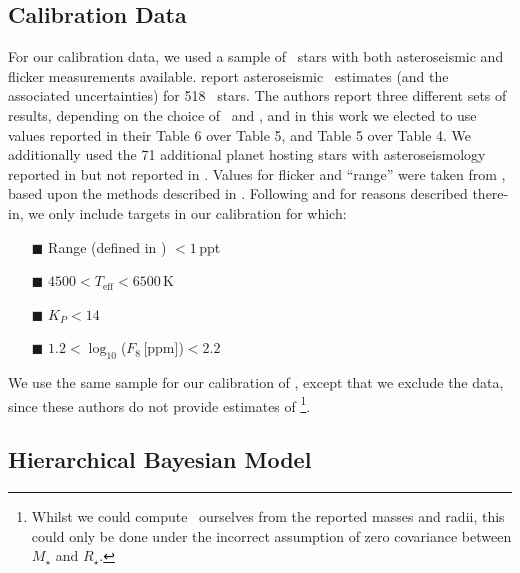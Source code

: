 
\subsection{Calibration Data}

For our calibration data, we used a sample of \Kepler\ stars with
both asteroseismic and flicker measurements available. \citet{chaplin:2014}
report asteroseismic \rhostar\ estimates (and the associated uncertainties) for
518 \Kepler\ stars. The authors report three different sets of results,
depending on the choice of \Teff\ and \FeH, and in this work we elected to use
values reported in their Table 6 over Table 5, and Table 5 over Table 4. We
additionally used the 71 additional planet hosting stars with asteroseismology
reported in \citet{huber:2013} but not reported in \citet{chaplin:2014}. Values
for flicker and ``range'' were taken from \citet{kipping:2014}, based upon the
methods described in \citet{bastien:2013}. Following \citet{kipping:2014} and
for reasons described there-in, we only include targets in our calibration for
which:

\begin{itemize}
\item[{\tiny$\blacksquare$}] Range (defined in \citealt{bastien:2013})
$<1$\,ppt
\item[{\tiny$\blacksquare$}] $4500<T_{\mathrm{eff}}<6500$\,K
\item[{\tiny$\blacksquare$}] $K_P<14$
\item[{\tiny$\blacksquare$}] $1.2 < \log_{10}$($F_8$\,[ppm])$< 2.2$
\end{itemize}

We use the same sample for our calibration of \logg, except that we exclude the
\citet{huber:2013} data, since these authors do not provide estimates of
\logg\footnote{Whilst we could compute \logg\ ourselves from the reported
masses and radii, this could only be done under the incorrect assumption of
zero covariance between $M_{\star}$ and $R_{\star}$.}.

\subsection{Hierarchical Bayesian Model}

